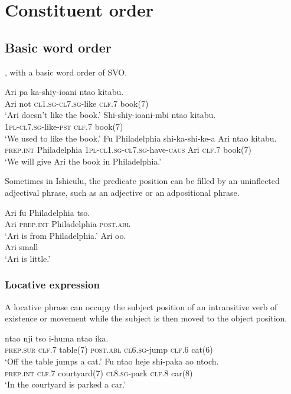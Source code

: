 \chapter{Constituent order}

\section{Basic word order}
, with a basic word order of SVO.

\begin{exe}
\ex
\gll Ari pa ka-shiy-ioani nta\textbeltl o kitabu. \\
Ari not \textsc{cl1.sg}-\textsc{cl7.sg}-like \textsc{clf}.7 book(7) \\
\trans `Ari doesn't like the book.'
\ex
\gll Shi-shiy-ioani-mbi nta\textbeltl o kitabu. \\
\textsc{1pl}-\textsc{cl7.sg}-like-\textsc{pst} \textsc{clf}.7 book(7) \\
\trans `We used to like the book.'\ex
\gll Fu Philadelphia shi-ka-shi-ke-\textbeltl a Ari nta\textbeltl o kitabu. \\
\textsc{prep.int} Philadelphia \textsc{1pl}-\textsc{cl1.sg}-\textsc{cl7.sg}-have-\textsc{caus} Ari \textsc{clf}.7 book(7) \\
\trans `We will give Ari the book in Philadelphia.'
\end{exe}

Sometimes in Ishiculu, the predicate position can be filled by an uninflected adjectival phrase, such as an adjective or an adpositional phrase.

\begin{exe}
\ex
\gll Ari fu Philadelphia tso. \\
Ari \textsc{prep.int} Philadelphia \textsc{post.abl} \\
\trans `Ari is from Philadelphia.'
\ex
\gll Ari \textbeltl o\textbeltl o. \\
Ari small \\
\trans `Ari is little.'
\end{exe}

\subsection{Locative expression}
A locative phrase can occupy the subject position of an intransitive verb of existence or movement while the subject is then moved to the object position.

\begin{exe}
\ex
{} nta\textbeltl o nji tso \textbeltl i-huma nta\textbeltl o ika. \\
\textsc{prep.sur} \textsc{clf.7} table(7) \textsc{post.abl} \textsc{cl6.sg}-jump \textsc{clf}.6 cat(6) \\
\trans `Off the table jumps a cat.'
\ex
\gll Fu nta\textbeltl o heje shi-paka a\textlyoghlig o ntoch\textramshorns. \\
\textsc{prep.int} \textsc{clf.7} courtyard(7) \textsc{cl8.sg}-park \textsc{clf}.8 car(8) \\
\trans `In the courtyard is parked a car.'
\end{exe}

